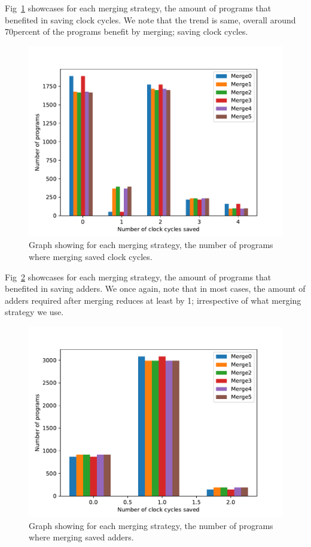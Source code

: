     Fig~\ref{Fig5} showcases for each merging strategy, the amount of programs that benefited in saving clock cycles.
    We note that the trend is same, overall around 70percent of the programs benefit by merging; saving clock cycles.
    \begin{figure}
        \centering
        \includegraphics[scale=0.5]{per_merge_clck_saved.pdf}
        \caption{Graph showing for each merging strategy, the number of programs where merging saved clock cycles.}
        \label{Fig5}
    \end{figure}
    
    Fig~\ref{Fig6} showcases for each merging strategy, the amount of programs that benefited in saving adders.
    We once again, note that in most cases, the amount of adders required after merging reduces at least by 1; irrespective of what merging strategy we use. 
    \begin{figure}
        \centering
        \includegraphics[scale=0.5]{per_merge_add_saved.pdf}
        \caption{Graph showing for each merging strategy, the number of programs where merging saved adders.}
        \label{Fig6}
    \end{figure}

